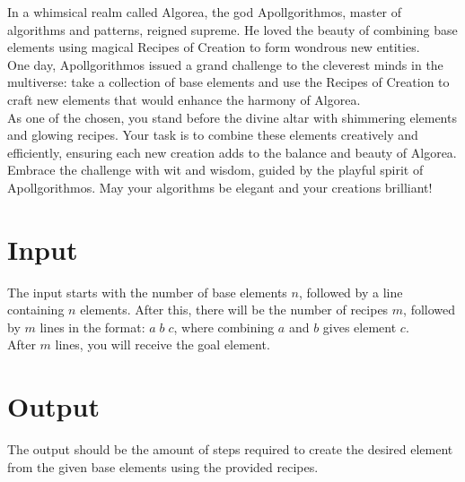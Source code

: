 In a whimsical realm called Algorea, the god Apollgorithmos, master of algorithms and patterns, reigned supreme. He loved the beauty of combining base elements using magical Recipes of Creation to form wondrous new entities.\\
One day, Apollgorithmos issued a grand challenge to the cleverest minds in the multiverse: take a collection of base elements and use the Recipes of Creation to craft new elements that would enhance the harmony of Algorea.\\
As one of the chosen, you stand before the divine altar with shimmering elements and glowing recipes. Your task is to combine these elements creatively and efficiently, ensuring each new creation adds to the balance and beauty of Algorea.\\
Embrace the challenge with wit and wisdom, guided by the playful spirit of Apollgorithmos. May your algorithms be elegant and your creations brilliant!
\section*{Input}
The input starts with the number of base elements \(n\), followed by a line containing \(n\) elements. After this, there will be the number of recipes \(m\), followed by \(m\) lines in the format: \(a\;b\;c\), where combining \(a\) and \(b\) gives element \(c\).\\
After \(m\) lines, you will receive the goal element.
\section*{Output}
The output should be the amount of steps required to create the desired element from the given base elements using the provided recipes.
